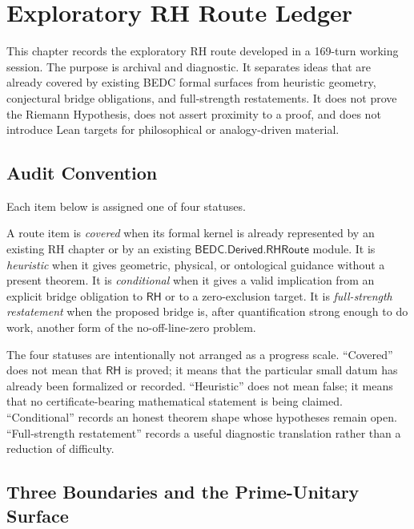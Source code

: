 \chapter{Exploratory RH Route Ledger}
\label{ch:visions-rh-exploratory-route-ledger}

This chapter records the exploratory RH route developed in a 169-turn
working session.  The purpose is archival and diagnostic.  It separates
ideas that are already covered by existing BEDC formal surfaces from
heuristic geometry, conjectural bridge obligations, and full-strength
restatements.  It does not prove the Riemann Hypothesis, does not assert
proximity to a proof, and does not introduce Lean targets for philosophical
or analogy-driven material.

\section{Audit Convention}
\label{sec:rh-exploratory-ledger-audit-convention}

Each item below is assigned one of four statuses.

\begin{definition}
\label{def:rh-exploratory-route-ledger-status}
A route item is \emph{covered} when its formal kernel is already represented
by an existing RH chapter or by an existing
$\mathsf{BEDC.Derived.RHRoute}$ module.  It is \emph{heuristic} when it gives
geometric, physical, or ontological guidance without a present theorem.  It
is \emph{conditional} when it gives a valid implication from an explicit
bridge obligation to $\mathsf{RH}$ or to a zero-exclusion target.  It is
\emph{full-strength restatement} when the proposed bridge is, after
quantification strong enough to do work, another form of the
no-off-line-zero problem.
\end{definition}

The four statuses are intentionally not arranged as a progress scale.
``Covered'' does not mean that $\mathsf{RH}$ is proved; it means that the
particular small datum has already been formalized or recorded.  ``Heuristic''
does not mean false; it means that no certificate-bearing mathematical
statement is being claimed.  ``Conditional'' records an honest theorem shape
whose hypotheses remain open.  ``Full-strength restatement'' records a useful diagnostic
translation rather than a reduction of difficulty.

\section{Three Boundaries and the Prime-Unitary Surface}
\label{sec:rh-ledger-three-boundaries-prime-unitary}

